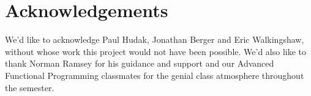 \documentclass{article}
\begin{document}
\section{Acknowledgements}

We'd like to acknowledge Paul Hudak, Jonathan Berger and Eric Walkingshaw, without whose work
this project would not have been possible.  We'd also like to thank Norman 
Ramsey for his guidance and support and our Advanced Functional
Programming classmates for the genial class atmosphere throughout the semester.

\printbibliography
%
\end{document}
